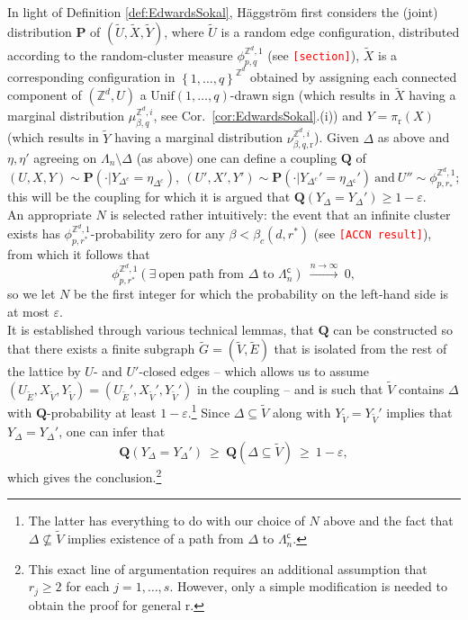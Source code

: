 \documentclass[12pt]{article}
\newcommand{\PP}{\mathbf{P}}
\newcommand{\Q}{\mathbf{Q}}
\renewcommand{\r}{\mathrm{r}}
\newcommand{\Z}{\mathbb{Z}}
\newcommand{\set}[1]{\left\{#1\right\}}
\newcommand{\ra}{\rightarrow}
\newcommand{\pika}{\boldsymbol{\cdot}}
\newcommand{\1}{\mathbbm{1}}
\renewcommand{\c}{\mathsf{c}}
\newcommand{\5}{\vspace{0.5cm}}
\renewcommand{\tilde}{\widetilde}
\theoremstyle{definition}
\begin{document}
In light of Definition \ref{def:EdwardsSokal}, H\"aggstr\"om first considers the (joint) distribution $\PP$ of $(\tilde{U},\tilde{X},\tilde{Y})$, where $\tilde{U}$ is a random edge configuration, distributed according to the random-cluster measure $\phi_{p,q}^{\Z^d,1}$ (see \textcolor{red}{\texttt{[section]}}), $\tilde{X}$ is a corresponding configuration in $\set{1,\ldots,q}^{\Z^d}$ obtained by assigning each connected component of $(\Z^d,U)$ a $\mathrm{Unif}(1,\ldots,q)$-drawn sign (which results in $\tilde{X}$ having a marginal distribution $\mu_{\beta,q}^{\Z^d, i}$, see Cor.~\ref{cor:EdwardsSokal}.(i)) and $Y=\pi_\r(X)$ (which results in $\tilde{Y}$ having a marginal distribution $\nu_{\beta,q,\r}^{\Z^d,i}$). Given $\Delta$ as above and $\eta,\eta'$ agreeing on $\Lambda_n\setminus\Delta$ (as above) one can define a coupling $\Q$ of 
$$(U,X,Y)\sim\PP(\pika|Y_{\Delta^c}=\eta_{\Delta^c}),~(U',X',Y')\sim\PP(\pika|Y_{\Delta^c}'=\eta_{\Delta^\c}')~\text{and}~U''\sim\phi_{p,r_*}^{\Z^d,1};$$
this will be the coupling for which it is argued that $\Q(Y_{\Delta}=Y_{\Delta}')\geq 1-\varepsilon$. \\

An appropriate $N$ is selected rather intuitively: the event that an infinite cluster exists has $\phi_{p,r^*}^{\Z^d,1}$-probability zero for any $\beta<\beta_c(d,r^*)$ (see \textcolor{red}{\texttt{[ACCN result]}}), from which it follows that
$$\phi_{p,r^*}^{\Z^d,1}(\exists~\text{open path from $\Delta$ to $\Lambda_n^\c$}) ~\xrightarrow{n\ra\infty}~ 0,$$
so we let $N$ be the first integer for which the probability on the left-hand side is at most $\varepsilon$. \\

It is established through various technical lemmas, that $\Q$ can be constructed so that there exists a finite subgraph $\tilde{G}=(\tilde{V},\tilde{E})$ that is isolated from the rest of the lattice by $U$- and $U'$-closed edges -- which allows us to assume $(U_{\tilde{E}},X_{\tilde{V}},Y_{\tilde{V}})=(U_{\tilde{E}}',X_{\tilde{V}}',Y_{\tilde{V}}')$ in the coupling -- and is such that $\tilde{V}$ contains $\Delta$ with $\Q$-probability at least $1-\varepsilon$.\footnote{The latter has everything to do with our choice of $N$ above and the fact that $\Delta\not\subseteq\tilde{V}$ implies existence of a path from $\Delta$ to $\Lambda_n^\c$.} Since $\Delta\subseteq\tilde{V}$ along with $Y_{\tilde{V}}=Y_{\tilde{V}}'$ implies that $Y_{\Delta}=Y_{\Delta}'$, one can infer that 
$$\Q(Y_{\Delta}=Y_{\Delta}') ~\geq~ \Q(\Delta\subseteq\tilde{V}) ~\geq~ 1-\varepsilon,$$
which gives the conclusion.\footnote{This exact line of argumentation requires an additional assumption that $r_j\geq 2$ for each $j=1,\ldots,s$. However, only a simple modification is needed to obtain the proof for general $\r$.} \\
\end{document}
